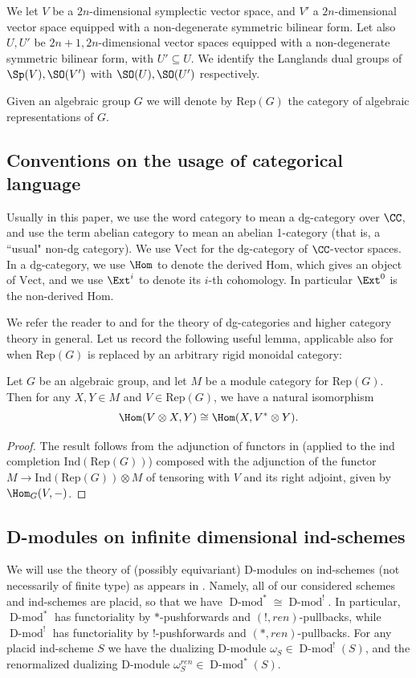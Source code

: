 \documentclass[11pt]{article}
\begin{document}
We let $V$ be a $2n$-dimensional symplectic vector space, and $V'$ a $2n$-dimensional vector space equipped with a non-degenerate symmetric bilinear form. Let also $U,U'$ be $2n+1,2n$-dimensional vector spaces equipped with a non-degenerate symmetric bilinear form, with $U'\subseteq U$. We identify the Langlands dual groups of $\Sp(V), \SO(V')$ with $\SO(U), \SO(U')$ respectively.

Given an algebraic group $G$ we will denote by $\mathrm{Rep}(G)$ the category of algebraic representations of $G$.

\subsection{Conventions on the usage of categorical language}
Usually in this paper, we use the word category to mean a dg-category over $\CC$, and use the term abelian category to mean an abelian 1-category (that is, a ``usual" non-dg category). We use $\mathrm{Vect}$ for the dg-category of $\CC$-vector spaces. In a dg-category, we use $\Hom$ to denote the derived Hom, which gives an object of $\mathrm{Vect}$, and we use $\Ext^i$ to denote its $i$-th cohomology. In particular $\Ext^0$ is the non-derived Hom.

We refer the reader to \cite{Lu} and \cite{GaR} for the theory of dg-categories and higher category theory in general.
Let us record the following useful lemma, applicable also for when $\mathrm{Rep}(G)$ is replaced by an arbitrary rigid monoidal category:
\begin{lemma}\label{lemma: rigidity}
    Let $G$ be an algebraic group, and let $M$ be a module category for $\mathrm{Rep}(G)$. Then for any $X,Y\in M$ and $V\in \mathrm{Rep}(G)$, we have a natural isomorphism
    $$\Hom(V\otimes X, Y)\cong \Hom(X, V^*\otimes Y).$$
\end{lemma}
\begin{proof}
    The result follows from the adjunction of functors in \cite[Lemma 9.3.2]{GaR} (applied to the ind completion $\mathrm{Ind}(\mathrm{Rep}(G))$) composed with the adjunction of the functor $M\to \mathrm{Ind}(\mathrm{Rep}(G))\otimes M$ of tensoring with $V$ and its right adjoint, given by $\Hom_G(V,-)$.
\end{proof}
\subsection{D-modules on infinite dimensional ind-schemes}\label{sec: D-modules}
We will use the theory of (possibly equivariant) D-modules on ind-schemes (not necessarily of finite type) as appears in \cite{Ras}. Namely, all of our considered schemes and ind-schemes are placid, so that we have $\operatorname{D-mod}^*\cong \operatorname{D-mod}^!$.
In particular, $\operatorname{D-mod}^*$ has functoriality by $*$-pushforwards and $(!,ren)$-pullbacks, while $\operatorname{D-mod}^!$ has functoriality by $!$-pushforwards and $(*,ren)$-pullbacks. For any placid ind-scheme $S$ we have the dualizing D-module $\omega_S\in\operatorname{D-mod}^!(S)$, and the renormalized dualizing D-module $\omega_S^{ren}\in \operatorname{D-mod}^*(S)$.
\end{document}
